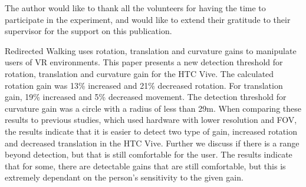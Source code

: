 



The author would like to thank all the volunteers for having the time to participate in the experiment, and would like to extend their gratitude to their supervisor for the support on this publication.


Redirected Walking uses rotation, translation and curvature gains to manipulate users of VR environments. This paper presents a new detection threshold for rotation, translation and curvature gain for the HTC Vive. The calculated rotation gain was 13\% increased and 21\% decreased rotation. For translation gain, 19\% increased and 5\% decreased movement. The detection threshold for curvature gain was a circle with a radius of less than 29m. When comparing these results to previous studies, which used hardware with lower resolution and FOV, the results indicate that it is easier to detect two type of gain, increased rotation and decreased translation in the HTC Vive. Further we discuss if there is a range beyond detection, but that is still comfortable for the user. The results indicate that for some, there are detectable gains that are still comfortable, but this is extremely dependant on the person's sensitivity to the given gain.
